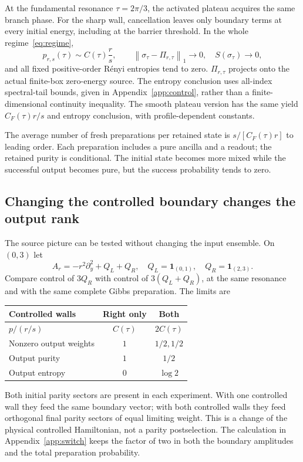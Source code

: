 \documentclass[aps,pra,reprint,superscriptaddress,longbibliography]{revtex4-2}
\newcommand{\norm}[1]{\left\lVert#1\right\rVert}
\newcommand{\one}{\mathbf 1}
\begin{document}
At the fundamental resonance $\tau=2\pi/3$, the activated plateau
acquires the same branch phase. For the sharp wall, cancellation leaves
only boundary terms at every initial energy, including at the barrier
threshold. In the whole regime~\eqref{eq:regime},
\begin{equation}
 p_{r,s}(\tau)\sim C(\tau)\frac r s,\qquad
 \norm{\sigma_\tau-\Pi_{r,\tau}}_1\to0,
 \quad S(\sigma_\tau)\to0,                                  \label{eq:resonance}
\end{equation}
and all fixed positive-order R\'enyi entropies tend to zero.
$\Pi_{r,\tau}$ projects onto the actual finite-box zero-energy source.
The entropy conclusion uses all-index spectral-tail bounds, given
in Appendix~\ref{app:control}, rather than a finite-dimensional
continuity inequality. The smooth plateau version has the same yield
$C_F(\tau)r/s$ and entropy conclusion, with profile-dependent constants.

The average number of fresh preparations per retained state is
$s/[C_F(\tau)r]$ to leading order. Each preparation includes a pure
ancilla and a readout; the retained purity is conditional. The initial
state becomes more mixed while the successful output becomes pure,
but the success probability tends to zero.

\subsection{Changing the controlled boundary changes the output rank}

The source picture can be tested without changing the input ensemble.
On $(0,3)$ let
\begin{equation}
 A_r=-r^2\partial_y^2+Q_L+Q_R,\quad
 Q_L=\one_{(0,1)},\quad Q_R=\one_{(2,3)}.                       \label{eq:twowell}
\end{equation}
Compare control of $3Q_R$ with control of $3(Q_L+Q_R)$, at the same
resonance and with the same complete Gibbs preparation. The limits are
\begin{center}
\begin{tabular}{lcc}
\toprule
Controlled walls & Right only & Both\\
\midrule
$p/(r/s)$ & $C(\tau)$ & $2C(\tau)$\\
Nonzero output weights & $1$ & $1/2,1/2$\\
Output purity & $1$ & $1/2$\\
Output entropy & $0$ & $\log2$\\
\bottomrule
\end{tabular}
\end{center}
Both initial parity sectors are present in each experiment. With one
controlled wall they feed the same boundary vector; with both controlled
walls they feed orthogonal final parity sectors of equal limiting
weight. This is a change of the physical controlled Hamiltonian, not
a parity postselection. The calculation in Appendix~\ref{app:switch}
keeps the factor of two in both the boundary amplitudes and the total
preparation probability.
\end{document}
